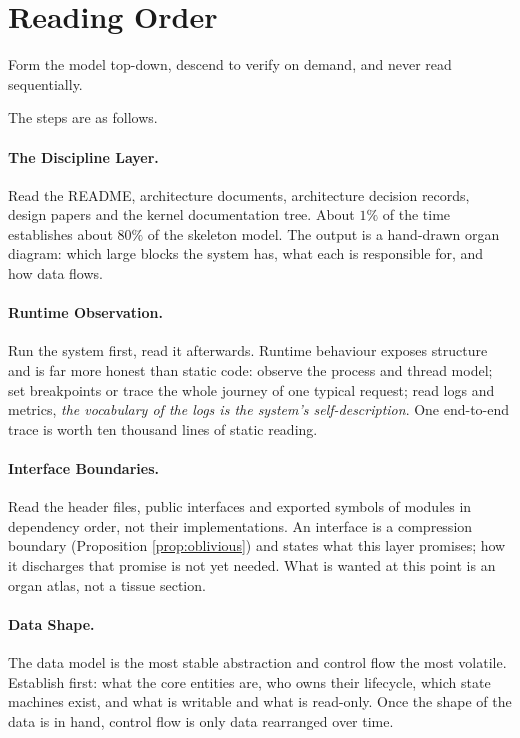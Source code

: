 \section{Reading Order}\label{sec:protocol}

\begin{principle}\label{pr:protocol}
Form the model top-down, descend to verify on demand, and never read sequentially.
\end{principle}

The steps are as follows.

\paragraph{The Discipline Layer.}
Read the README, architecture documents, architecture decision records, design papers and the
kernel documentation tree. About $1\%$ of the time establishes about $80\%$ of the skeleton
model. The output is a hand-drawn organ diagram: which large blocks the system has, what each
is responsible for, and how data flows.

\paragraph{Runtime Observation.}
Run the system first, read it afterwards. Runtime behaviour exposes structure and is far more
honest than static code: observe the process and thread model; set breakpoints or trace the
whole journey of one typical request; read logs and metrics, \emph{the vocabulary of the logs
is the system's self-description}. One end-to-end trace is worth ten thousand lines of static
reading.

\paragraph{Interface Boundaries.}
Read the header files, public interfaces and exported symbols of modules in dependency order,
not their implementations. An interface is a compression boundary (Proposition
\ref{prop:oblivious}) and states what this layer promises; how it discharges that promise is
not yet needed. What is wanted at this point is an organ atlas, not a tissue section.

\paragraph{Data Shape.}
The data model is the most stable abstraction and control flow the most volatile. Establish
first: what the core entities are, who owns their lifecycle, which state machines exist, and
what is writable and what is read-only. Once the shape of the data is in hand, control flow is
only data rearranged over time.


